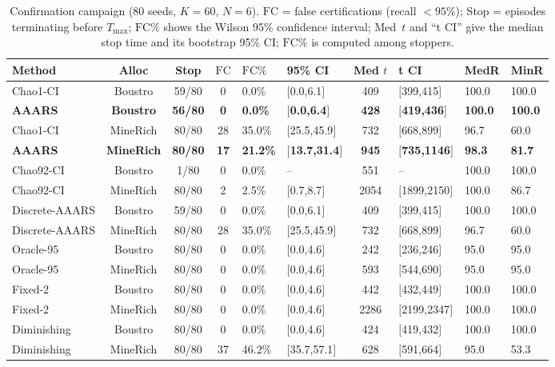 \documentclass[11pt]{article}
\newcommand{\FC}{\mathrm{FC}}
\begin{document}
\begin{table}[t]
\centering
\caption{Confirmation campaign (80 seeds, $K{=}60$, $N{=}6$). $\FC$ = false certifications
(recall $<95\%$); Stop = episodes terminating before $T_{\max}$; $\FC\%$ shows the Wilson 95\%
confidence interval; Med~$t$ and ``t CI'' give the median stop time and its bootstrap 95\% CI;
$\FC\%$ is computed among stoppers.}
\label{tab:confirm}
\begin{tabular}{lcccllclll}
\toprule
Method & Alloc & Stop & $\FC$ & $\FC\%$ & 95\% CI & Med $t$ & t CI & MedR & MinR \\
\midrule
Chao1-CI       & Boustro  & 59/80 & 0  & 0.0\%  & {$[$0.0,6.1$]$}  & 409 & {$[$399,415$]$} & 100.0 & 100.0 \\
\textbf{AAARS} & \textbf{Boustro}  & \textbf{56/80} & \textbf{0}  & \textbf{0.0\%}  & \textbf{{$[$0.0,6.4$]$}}  & \textbf{428} & \textbf{{$[$419,436$]$}} & \textbf{100.0} & \textbf{100.0} \\
Chao1-CI       & MineRich & 80/80 & 28 & 35.0\% & {$[$25.5,45.9$]$} & 732 & {$[$668,899$]$} & 96.7 & 60.0 \\
\textbf{AAARS} & \textbf{MineRich} & \textbf{80/80} & \textbf{17} & \textbf{21.2\%} & \textbf{{$[$13.7,31.4$]$}} & \textbf{945} & \textbf{{$[$735,1146$]$}} & \textbf{98.3} & \textbf{81.7} \\
Chao92-CI      & Boustro  & 1/80  & 0  & 0.0\%  & --     & 551 & --     & 100.0 & 100.0 \\
Chao92-CI      & MineRich & 80/80 & 2  & 2.5\%  & {$[$0.7,8.7$]$}  & 2054 & {$[$1899,2150$]$} & 100.0 & 86.7 \\
Discrete-AAARS & Boustro  & 59/80 & 0  & 0.0\%  & {$[$0.0,6.1$]$}  & 409 & {$[$399,415$]$} & 100.0 & 100.0 \\
Discrete-AAARS & MineRich & 80/80 & 28 & 35.0\% & {$[$25.5,45.9$]$} & 732 & {$[$668,899$]$} & 96.7 & 60.0 \\
Oracle-95      & Boustro  & 80/80 & 0  & 0.0\%  & {$[$0.0,4.6$]$}  & 242 & {$[$236,246$]$} & 95.0 & 95.0 \\
Oracle-95      & MineRich & 80/80 & 0  & 0.0\%  & {$[$0.0,4.6$]$}  & 593 & {$[$544,690$]$} & 95.0 & 95.0 \\
Fixed-2        & Boustro  & 80/80 & 0  & 0.0\%  & {$[$0.0,4.6$]$}  & 442 & {$[$432,449$]$} & 100.0 & 100.0 \\
Fixed-2        & MineRich & 80/80 & 0  & 0.0\%  & {$[$0.0,4.6$]$}  & 2286 & {$[$2199,2347$]$} & 100.0 & 100.0 \\
Diminishing    & Boustro  & 80/80 & 0  & 0.0\%  & {$[$0.0,4.6$]$}  & 424 & {$[$419,432$]$} & 100.0 & 100.0 \\
Diminishing    & MineRich & 80/80 & 37 & 46.2\% & {$[$35.7,57.1$]$} & 628 & {$[$591,664$]$} & 95.0 & 53.3 \\
\bottomrule
\end{tabular}
\end{table}
\end{document}
